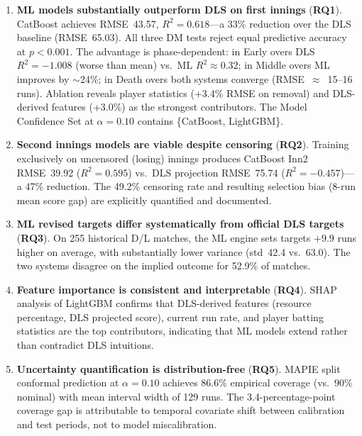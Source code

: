 \documentclass[12pt,a4paper,oneside]{report}
\begin{document}
\begin{enumerate}
    \item \textbf{ML models substantially outperform DLS on first innings} (\textbf{RQ1}).  CatBoost achieves RMSE~43.57, $R^2=0.618$---a 33\% reduction over the DLS baseline (RMSE~65.03).  All three DM tests reject equal predictive accuracy at $p < 0.001$.  The advantage is phase-dependent: in Early overs DLS $R^2 = -1.008$ (worse than mean) vs.\ ML $R^2 \approx 0.32$; in Middle overs ML improves by $\sim$24\%; in Death overs both systems converge (RMSE~$\approx$~15--16 runs).  Ablation reveals player statistics (+3.4\% RMSE on removal) and DLS-derived features (+3.0\%) as the strongest contributors.  The Model Confidence Set at $\alpha=0.10$ contains \{CatBoost, LightGBM\}.

    \item \textbf{Second innings models are viable despite censoring} (\textbf{RQ2}).  Training exclusively on uncensored (losing) innings produces CatBoost Inn2 RMSE~39.92 ($R^2=0.595$) vs.\ DLS projection RMSE~75.74 ($R^2=-0.457$)---a 47\% reduction.  The 49.2\% censoring rate and resulting selection bias (8-run mean score gap) are explicitly quantified and documented.

    \item \textbf{ML revised targets differ systematically from official DLS targets} (\textbf{RQ3}).  On 255 historical D/L matches, the ML engine sets targets $+9.9$ runs higher on average, with substantially lower variance (std~42.4 vs.\ 63.0).  The two systems disagree on the implied outcome for 52.9\% of matches.

    \item \textbf{Feature importance is consistent and interpretable} (\textbf{RQ4}).  SHAP analysis of LightGBM confirms that DLS-derived features (resource percentage, DLS projected score), current run rate, and player batting statistics are the top contributors, indicating that ML models extend rather than contradict DLS intuitions.

    \item \textbf{Uncertainty quantification is distribution-free} (\textbf{RQ5}).  MAPIE split conformal prediction at $\alpha=0.10$ achieves 86.6\% empirical coverage (vs.\ 90\% nominal) with mean interval width of 129 runs.  The 3.4-percentage-point coverage gap is attributable to temporal covariate shift between calibration and test periods, not to model miscalibration.


\end{enumerate}
\end{document}
